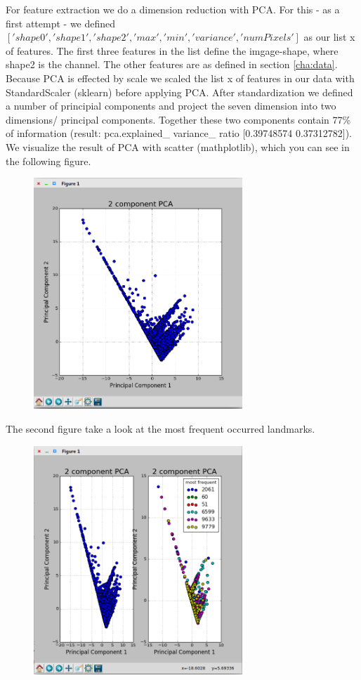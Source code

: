 For feature extraction we do a dimension reduction with PCA. For this - as a first attempt - we defined $['shape0','shape1','shape2','max','min','variance','numPixels']$ as our list x of features. 
The first three features in the list define the imgage-shape, where shape2 is the channel. The other features are as defined in section \ref{cha:data}. 
Because PCA is effected by scale we scaled the list x of features in our data with StandardScaler (sklearn)  before applying PCA.  
After standardization we  defined a number of principial components and project the seven dimension into two dimensions/ principal components. 
Together these two components contain 77\% of information (result: pca.explained\_ variance\_ ratio [0.39748574 0.37312782]).
We visualize the result of PCA with scatter (mathplotlib), which you can see in the following figure.  
\begin{figure}
	\includegraphics[width=0.7\textwidth]{images/pca}
\end{figure}

The second figure take a look at the most frequent occurred landmarks.
\begin{figure}
	\includegraphics[width=0.7\textwidth]{images/pca2}
\end{figure}



